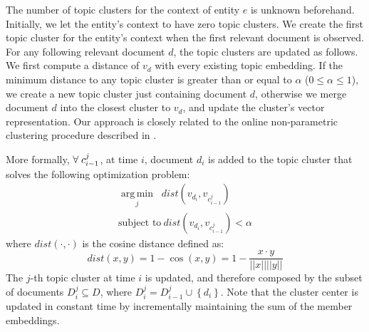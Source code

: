 \documentclass{sig-alternate}
\DeclareMathOperator*{\argmin}{arg\,min}
\begin{document}
The number of topic clusters for the context of entity $e$ is unknown beforehand. Initially, we let the entity's context to have zero topic clusters. 
We create the first topic cluster for the entity's context when the first relevant document is observed. 
For any following relevant document $d$, the topic clusters are updated as follows.
We first compute a distance of $v_d$ with every existing topic embedding.
If the minimum distance to any topic cluster is greater than or equal to $\alpha$ ($0 \leq \alpha \leq 1$), we create a new topic cluster just containing document $d$, otherwise we merge document $d$ into the closest cluster to $v_d$, and update the cluster's vector representation.
Our approach is closely related to the online non-parametric clustering procedure described in \citet{Arvind14}.


More formally, $\forall\hspace{1mm}c^j_{i-1}$, at time $i$, document $d_i$ is added to the topic cluster that solves the following optimization problem:
\begin{eqnarray}
\underset{j}{\argmin}\;\; dist(v_{d_i}, v_{c^j_{i-1}}) \nonumber\\
\text{subject to}~dist(v_{d_i}, v_{c^j_{i-1}}) < \alpha 
\end{eqnarray}
where $dist(\cdot,\cdot)$ is the cosine distance defined as: %
\begin{equation}
\label{cosine}
dist(x,y) = 1 - \cos(x,y) = 1 - \frac{x \cdot y}{||x||||y||}
\end{equation}
The $j$-th topic cluster at time $i$ is updated, and therefore composed by the subset of documents $D^j_i \subseteq D$, where $D^j_i = D^j_{i-1} \cup \left\{ {d_i}\right\}$.
Note that the cluster center is updated in constant time by incrementally maintaining the sum of the member embeddings.

\end{document}
